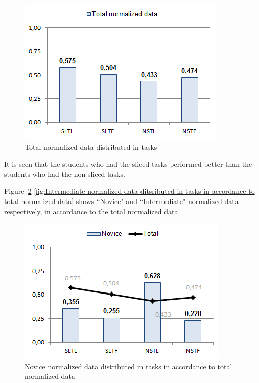 \documentclass{sig-alternate-05-2015}
\begin{document}
\begin{figure}[!ht]
	\centering
	\includegraphics[width=1\linewidth]{img10}
	\caption{Total normalized data distributed in tasks}
	\label{fig:Total normalized data distributed in tasks}
\end{figure}

It is seen that the students who had the sliced tasks performed better than the students who had the non-sliced tasks.

Figure~\ref{fig:Novice normalized data distributed in tasks in accordance to total normalized data}-\ref{fig:Intermediate normalized data ditsributed in tasks in accordance to total normalized data} shows ``Novice" and ``Intermediate" normalized data respectively, in accordance to the total normalized data.

\begin{figure}[!ht]
	\centering
	\includegraphics[width=1\linewidth]{img11}
	\caption{Novice normalized data distributed in tasks in accordance to total normalized data}
	\label{fig:Novice normalized data distributed in tasks in accordance to total normalized data}
\end{figure}
\end{document}
